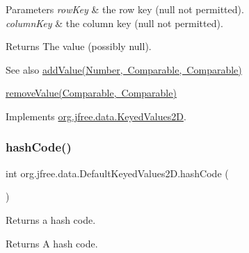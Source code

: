 \begin{DoxyParams}{Parameters}
{\em row\+Key} & the row key ({\ttfamily null} not permitted). \\
\hline
{\em column\+Key} & the column key ({\ttfamily null} not permitted).\\
\hline
\end{DoxyParams}
\begin{DoxyReturn}{Returns}
The value (possibly {\ttfamily null}).
\end{DoxyReturn}
\begin{DoxySeeAlso}{See also}
\mbox{\hyperlink{classorg_1_1jfree_1_1data_1_1_default_keyed_values2_d_a16fb58c6725b8f0a6d6301229bb87628}{add\+Value(\+Number, Comparable, Comparable)}} 

\mbox{\hyperlink{classorg_1_1jfree_1_1data_1_1_default_keyed_values2_d_a2bc7617889df5d3977fff377c0ddceb7}{remove\+Value(\+Comparable, Comparable)}} 
\end{DoxySeeAlso}


Implements \mbox{\hyperlink{interfaceorg_1_1jfree_1_1data_1_1_keyed_values2_d_a61c450ca108cd99e53174fc91393a99a}{org.\+jfree.\+data.\+Keyed\+Values2D}}.

\mbox{\label{classorg_1_1jfree_1_1data_1_1_default_keyed_values2_d_ad85ac47a73777119f99930ccb56d8245}} 
\subsubsection{\texorpdfstring{hash\+Code()}{hashCode()}}
{\footnotesize\ttfamily int org.\+jfree.\+data.\+Default\+Keyed\+Values2\+D.\+hash\+Code (\begin{DoxyParamCaption}{ }\end{DoxyParamCaption})}

Returns a hash code.

\begin{DoxyReturn}{Returns}
A hash code. 
\end{DoxyReturn}
\mbox{\label{classorg_1_1jfree_1_1data_1_1_default_keyed_values2_d_addf0f65958a134a32cccc78d7b2e4024}} 
